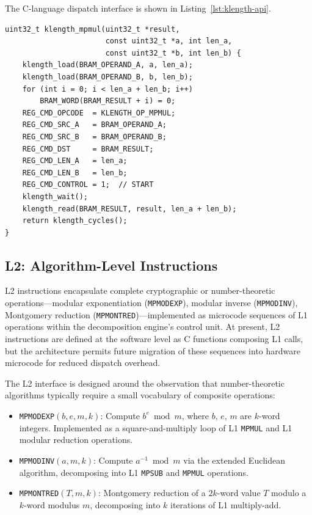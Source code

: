 \documentclass[11pt,a4paper]{article}
\begin{document}
The C-language dispatch interface is shown in Listing~\ref{lst:klength-api}.

\begin{lstlisting}[style=cstyle,caption={L1 dispatch API (excerpt from \texttt{kr\_klength.h}).  The core writes operands to BRAM, configures registers, and waits for completion.},label=lst:klength-api]
uint32_t klength_mpmul(uint32_t *result,
                       const uint32_t *a, int len_a,
                       const uint32_t *b, int len_b) {
    klength_load(BRAM_OPERAND_A, a, len_a);
    klength_load(BRAM_OPERAND_B, b, len_b);
    for (int i = 0; i < len_a + len_b; i++)
        BRAM_WORD(BRAM_RESULT + i) = 0;
    REG_CMD_OPCODE  = KLENGTH_OP_MPMUL;
    REG_CMD_SRC_A   = BRAM_OPERAND_A;
    REG_CMD_SRC_B   = BRAM_OPERAND_B;
    REG_CMD_DST     = BRAM_RESULT;
    REG_CMD_LEN_A   = len_a;
    REG_CMD_LEN_B   = len_b;
    REG_CMD_CONTROL = 1;  // START
    klength_wait();
    klength_read(BRAM_RESULT, result, len_a + len_b);
    return klength_cycles();
}
\end{lstlisting}

\subsection{L2: Algorithm-Level Instructions}
\label{sec:l2}

L2 instructions encapsulate complete cryptographic or number-theoretic
operations---modular exponentiation (\texttt{MPMODEXP}), modular inverse
(\texttt{MPMODINV}), Montgomery reduction (\texttt{MPMONTRED})---implemented
as microcode sequences of L1 operations within the decomposition engine's
control unit.  At present, L2 instructions are defined at the software level
as C functions composing L1 calls, but the architecture permits future
migration of these sequences into hardware microcode for reduced dispatch
overhead.

The L2 interface is designed around the observation that number-theoretic
algorithms typically require a small vocabulary of composite operations:

\begin{itemize}[leftmargin=*]
  \item \texttt{MPMODEXP}$(b, e, m, k)$: Compute $b^e \bmod m$, where $b$,
    $e$, $m$ are $k$-word integers.  Implemented as a square-and-multiply
    loop of L1 \texttt{MPMUL} and L1 modular reduction operations.
  \item \texttt{MPMODINV}$(a, m, k)$: Compute $a^{-1} \bmod m$ via the
    extended Euclidean algorithm, decomposing into L1 \texttt{MPSUB} and
    \texttt{MPMUL} operations.
  \item \texttt{MPMONTRED}$(T, m, k)$: Montgomery reduction of a $2k$-word
    value $T$ modulo a $k$-word modulus $m$, decomposing into $k$ iterations
    of L1 multiply-add.
\end{itemize}
\end{document}
